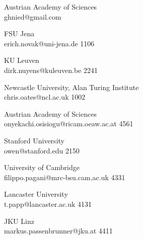 \begin{multicols}{2}
 {Austrian Academy of Sciences\\}%
 {ghnied@gmail.com}%
 {} %
 {} %
 {} %
 {} %
 {} %

 {FSU Jena\\}%
 {erich.novak@uni-jena.de}%
 {1106} %
 {} %
 {} %
 {} %
 {} %

 {KU Leuven\\}%
 {dirk.nuyens@kuleuven.be}%
 {2241} %
 {} %
 {} %
 {} %
 {} %

 {Newcastle University, Alan Turing Institute\\}%
 {chris.oates@ncl.ac.uk}%
 {1002} %
 {} %
 {} %
 {} %
 {} %

 {Austrian Academy of Sciences\\}%
 {onyekachi.osisiogu@ricam.oeaw.ac.at}%
 {4561} %
 {} %
 {} %
 {} %
 {} %

 {Stanford University\\}%
 {owen@stanford.edu}%
 {2150} %
 {} %
 {} %
 {} %
 {} %

 {University of Cambridge\\}%
 {filippo.pagani@mrc-bsu.cam.ac.uk}%
 {4331} %
 {} %
 {} %
 {} %
 {} %

 {Lancaster University\\}%
 {t.papp@lancaster.ac.uk}%
 {4131} %
 {} %
 {} %
 {} %
 {} %

 {JKU Linz\\}%
 {markus.passenbrunner@jku.at}%
 {4411} %
 {} %
 {} %
 {} %
 {} %


\end{multicols}
